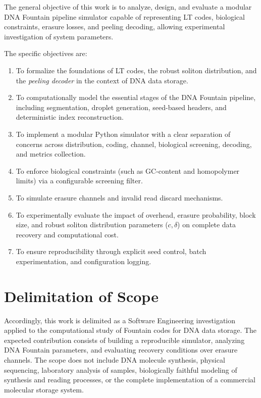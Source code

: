 The general objective of this work is to analyze, design, and evaluate a modular DNA Fountain pipeline simulator capable of representing LT codes, biological constraints, erasure losses, and peeling decoding, allowing experimental investigation of system parameters.

The specific objectives are:

\begin{enumerate}
    \item To formalize the foundations of LT codes, the robust soliton distribution, and the \emph{peeling decoder} in the context of DNA data storage.
    
    \item To computationally model the essential stages of the DNA Fountain pipeline, including segmentation, droplet generation, seed-based headers, and deterministic index reconstruction.
    
    \item To implement a modular Python simulator with a clear separation of concerns across distribution, coding, channel, biological screening, decoding, and metrics collection.
    
    \item To enforce biological constraints (such as GC-content and homopolymer limits) via a configurable screening filter.
    
    \item To simulate erasure channels and invalid read discard mechanisms.
    
    \item To experimentally evaluate the impact of overhead, erasure probability, block size, and robust soliton distribution parameters ($c, \delta$) on complete data recovery and computational cost.
    
    \item To ensure reproducibility through explicit seed control, batch experimentation, and configuration logging.
\end{enumerate}

\section{Delimitation of Scope}

Accordingly, this work is delimited as a Software Engineering investigation applied to the computational study of Fountain codes for DNA data storage. The expected contribution consists of building a reproducible simulator, analyzing DNA Fountain parameters, and evaluating recovery conditions over erasure channels. The scope does not include DNA molecule synthesis, physical sequencing, laboratory analysis of samples, biologically faithful modeling of synthesis and reading processes, or the complete implementation of a commercial molecular storage system.

